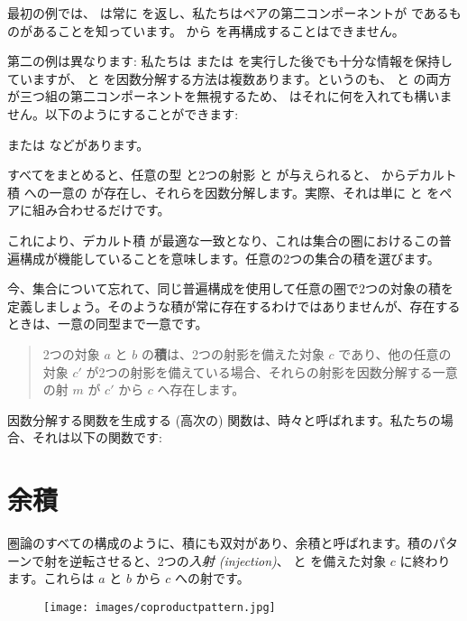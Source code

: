 最初の例では、 は常に  を返し、私たちはペアの第二コンポーネントが  であるものがあることを知っています。 から  を再構成することはできません。

第二の例は異なります: 私たちは  または  を実行した後でも十分な情報を保持していますが、 と  を因数分解する方法は複数あります。というのも、 と  の両方が三つ組の第二コンポーネントを無視するため、 はそれに何を入れても構いません。以下のようにすることができます: 


または
などがあります。

すべてをまとめると、任意の型  と2つの射影  と  が与えられると、 からデカルト積  への一意の  が存在し、それらを因数分解します。実際、それは単に  と  をペアに組み合わせるだけです。

これにより、デカルト積  が最適な一致となり、これは集合の圏におけるこの普遍構成が機能していることを意味します。任意の2つの集合の積を選びます。

今、集合について忘れて、同じ普遍構成を使用して任意の圏で2つの対象の積を定義しましょう。そのような積が常に存在するわけではありませんが、存在するときは、一意の同型まで一意です。

\begin{quote}
  2つの対象 $a$ と $b$ の\textbf{積}は、2つの射影を備えた対象 $c$ であり、他の任意の対象 $c'$ が2つの射影を備えている場合、それらの射影を因数分解する一意の射 $m$ が $c'$ から $c$ へ存在します。
\end{quote}

\noindent
因数分解する関数を生成する (高次の) 関数は、時々と呼ばれます。私たちの場合、それは以下の関数です: 


\section{余積}

圏論のすべての構成のように、積にも双対があり、余積と呼ばれます。積のパターンで射を逆転させると、2つの\emph{入射 (injection)}、 と  を備えた対象 $c$ に終わります。これらは $a$ と $b$ から $c$ への射です。


\begin{figure}[H]
  \centering
  \texttt{[image: images/coproductpattern.jpg]}
\end{figure}

